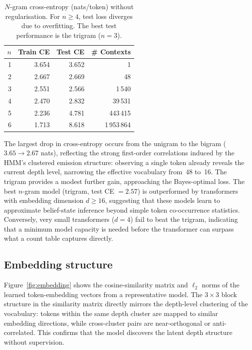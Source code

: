 \documentclass[11pt]{article}
\begin{document}
\begin{table}[htbp]
  \centering
  \begin{tabular}{r r r r}
    \toprule
    $n$ & Train CE & Test CE & \# Contexts \\
    \midrule
    1 & 3.654 & 3.652 &           1 \\
    2 & 2.667 & 2.669 &          48 \\
    3 & 2.551 & 2.566 &       1\,540 \\
    4 & 2.470 & 2.832 &      39\,531 \\
    5 & 2.236 & 4.781 &     443\,415 \\
    6 & 1.713 & 8.618 &   1\,953\,864 \\
    \bottomrule
  \end{tabular}
  \caption{$N$-gram cross-entropy (nats/token) without regularisation.
           For $n \geq 4$, test loss diverges due to overfitting.
           The best test performance is the trigram ($n = 3$).}
  \label{tab:ngram}
\end{table}

The largest drop in cross-entropy occurs from the unigram to the bigram
($3.65 \to 2.67$ nats), reflecting the strong first-order correlations
induced by the HMM's clustered emission structure: observing a single
token already reveals the current depth level, narrowing the effective
vocabulary from~48 to~16.  The trigram provides a modest further gain,
approaching the Bayes-optimal loss.  The best $n$-gram model (trigram,
test CE $= 2.57$) is outperformed by transformers with embedding
dimension $d \ge 16$, suggesting that these models learn to approximate
belief-state inference beyond simple token co-occurrence statistics.
Conversely, very small transformers ($d = 4$) fail to beat the trigram,
indicating that a minimum model capacity is needed before the
transformer can surpass what a count table captures directly.

\subsection{Embedding structure}

Figure~\ref{fig:embedding} shows the cosine-similarity matrix and
$\ell_2$ norms of the learned token-embedding vectors from a
representative model.  The $3 \times 3$ block structure in the
similarity matrix directly mirrors the depth-level clustering of the
vocabulary: tokens within the same depth cluster are mapped to similar
embedding directions, while cross-cluster pairs are near-orthogonal or
anti-correlated.  This confirms that the model discovers the latent
depth structure without supervision.
\end{document}
